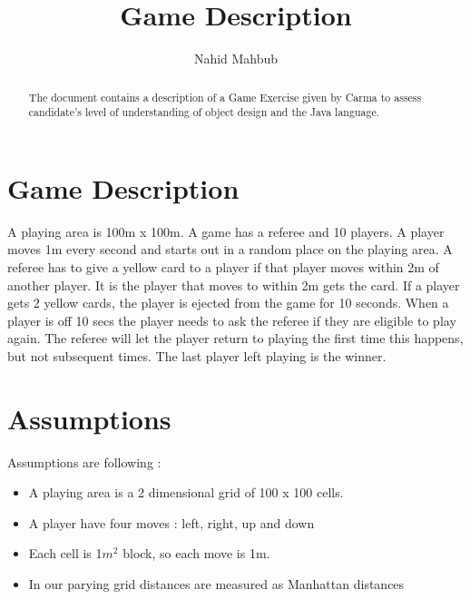 \documentclass[a4paper]{article}
\begin{document}
\title{\textbf{Game Description}}
\author{Nahid Mahbub}
\date{}
\maketitle

\begin{abstract}
The document contains a description of a Game Exercise given by Carma to assess candidate's level of understanding of object design and the Java language.
\end{abstract}

\section*{Game Description}
A playing area is 100m x 100m. A game has a referee and 10 players. A player moves 1m every second and starts out in a random place on the playing area. A referee has to give a yellow card to a player if that player moves within 2m of another player. It is the player that moves to within 2m gets the card. If a player gets 2 yellow cards, the player is ejected from the game for 10 seconds. When a player is off 10 secs the player needs to ask the referee if they are eligible to play again. The referee will let the player return to playing the first time this happens, but not subsequent times. The last player left playing is the winner.

\section*{Assumptions}
Assumptions are following :
\begin{itemize}
\item A playing area is a 2 dimensional grid of 100 x 100 cells.
\item A player have four moves : left, right, up and down
\item Each cell is 1$m^{2}$ block, so each move is 1m.
\item In our parying grid distances are measured as Manhattan distances
\end{itemize}
\end{document}
